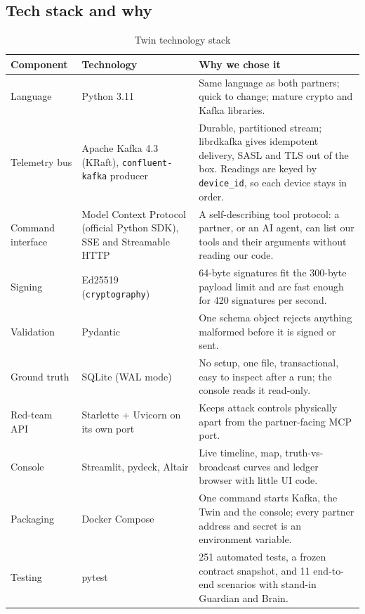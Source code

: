 \documentclass[10pt,a4paper]{article}
\begin{document}
\subsection{Tech stack and why}
\begin{table}[H]
\centering
\scriptsize
\renewcommand{\arraystretch}{0.92}
\caption{Twin technology stack}
\label{tab:tech_stack}
\begin{tabularx}{\textwidth}{L{2.1cm}L{3.7cm}Y}
\toprule
\textbf{Component} & \textbf{Technology} & \textbf{Why we chose it} \\
\midrule
Language & Python 3.11 & Same language as both partners; quick to change; mature crypto and Kafka libraries. \\
Telemetry bus & Apache Kafka 4.3 (KRaft), \texttt{confluent-kafka} producer & Durable, partitioned stream; librdkafka gives idempotent delivery, SASL and TLS out of the box. Readings are keyed by \texttt{device\_id}, so each device stays in order. \\
Command interface & Model Context Protocol (official Python SDK), SSE and Streamable HTTP & A self-describing tool protocol: a partner, or an AI agent, can list our tools and their arguments without reading our code. \\
Signing & Ed25519 (\texttt{cryptography}) & 64-byte signatures fit the 300-byte payload limit and are fast enough for 420 signatures per second. \\
Validation & Pydantic & One schema object rejects anything malformed before it is signed or sent. \\
Ground truth & SQLite (WAL mode) & No setup, one file, transactional, easy to inspect after a run; the console reads it read-only. \\
Red-team API & Starlette + Uvicorn on its own port & Keeps attack controls physically apart from the partner-facing MCP port. \\
Console & Streamlit, pydeck, Altair & Live timeline, map, truth-vs-broadcast curves and ledger browser with little UI code. \\
Packaging & Docker Compose & One command starts Kafka, the Twin and the console; every partner address and secret is an environment variable. \\
Testing & pytest & 251 automated tests, a frozen contract snapshot, and 11 end-to-end scenarios with stand-in Guardian and Brain. \\
\bottomrule
\end{tabularx}
\end{table}
\end{document}
